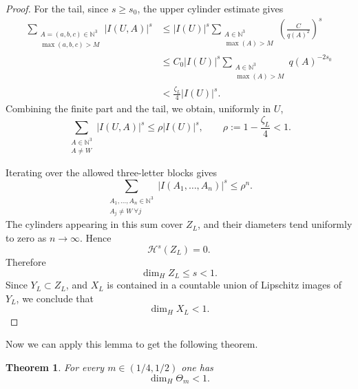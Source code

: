 \documentclass[11pt]{amsart}
\newtheorem{theorem}{Theorem}[section]
\begin{document}
\begin{proof}
For the tail, since $s\ge s_0$, the upper cylinder estimate gives
\begin{align*}
\sum_{\substack{A=(a,b,c)\in\mathbb N^3\\ \max(a,b,c)>M}}
|I(U,A)|^s
&\le
|I(U)|^s
\sum_{\substack{A\in\mathbb N^3\\ \max(A)>M}}
\left(\frac{C}{q(A)^2}\right)^s \\
&\le
C_0|I(U)|^s
\sum_{\substack{A\in\mathbb N^3\\ \max(A)>M}}
q(A)^{-2s_0} \\
&<
\frac{\zeta_L}{4}|I(U)|^s.
\end{align*}
Combining the finite part and the tail, we obtain, uniformly in $U$,
$$
\sum_{\substack{A\in\mathbb N^3\\ A\ne W}}
|I(U,A)|^s
\le
\rho |I(U)|^s,
\qquad
\rho:=1-\frac{\zeta_L}{4}<1.
$$

Iterating over the allowed three-letter blocks gives
$$
\sum_{\substack{A_1,\ldots,A_n\in\mathbb N^3\\ A_j\ne W\ \forall j}}
|I(A_1,\ldots,A_n)|^s
\le
\rho^n.
$$
The cylinders appearing in this sum cover $Z_L$, and their diameters tend uniformly to zero as $n\to\infty$. Hence
$$
\mathcal H^s(Z_L)=0.
$$
Therefore
$$
\dim_H Z_L\le s<1.
$$
Since $Y_L\subset Z_L$, and $X_L$ is contained in a countable union of Lipschitz images of $Y_L$, we conclude that
$$
\dim_H X_L<1.
$$
\end{proof}





Now we can apply this lemma to get the following theorem.


\begin{theorem}\label{thm:upper-bound-nontrivial}
For every $m\in(1/4,1/2)$ one has
$$
\dim_H\Theta_m<1.
$$
\end{theorem}
\end{document}
